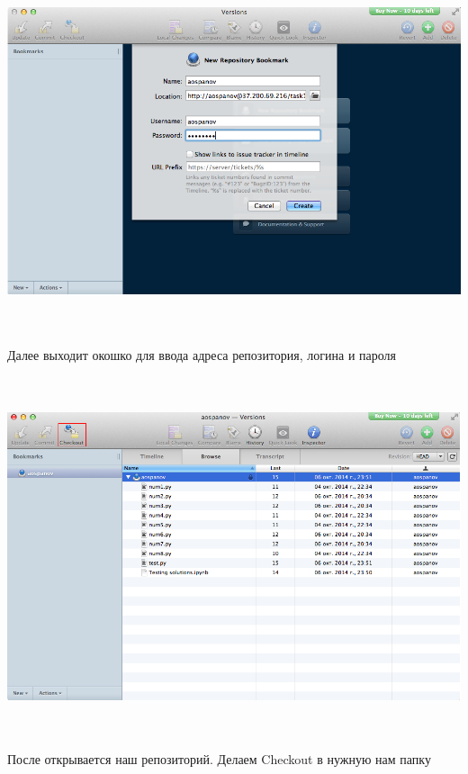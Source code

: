 \documentclass[12pt, a4paper]{article}
\begin{document}
			\begin{center}
				\includegraphics[height=10.5cm]{svn/svn_2.png}

				Далее выходит окошко для ввода адреса репозитория, логина и пароля \\

			\end{center}

			\begin{center}
				\includegraphics[height=10.5cm]{svn/svn_3.png}

				После открывается наш репозиторий. Делаем Checkout в нужную нам папку \\
				~\newline
			\end{center}
\end{document}
